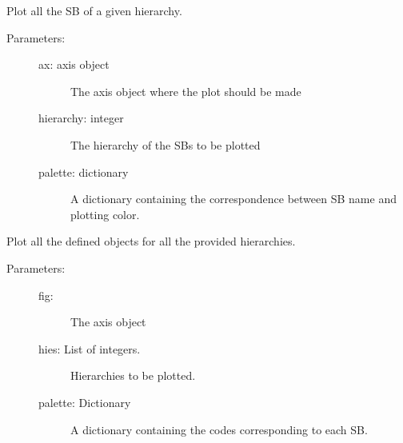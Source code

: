 \documentclass[letterpaper,10pt,english]{sphinxmanual}
\begin{document}
\begin{fulllineitems}
\label{\detokenize{hiegeo:hiegeo.plot_sb_by_hie_ax}}
Plot all the SB of a given hierarchy.
\begin{description}
\item[{Parameters:}] \leavevmode\begin{description}
\item[{ax: axis object}] \leavevmode
The axis object where the plot should be made

\item[{hierarchy: integer}] \leavevmode
The hierarchy of the SBs to be plotted

\item[{palette: dictionary}] \leavevmode
A dictionary containing the correspondence between
SB name and plotting color.

\end{description}

\end{description}

\end{fulllineitems}


\begin{fulllineitems}
\label{\detokenize{hiegeo:hiegeo.plot_sb_fig}}
Plot all the defined objects for all the provided hierarchies.
\begin{description}
\item[{Parameters:}] \leavevmode\begin{description}
\item[{fig:}] \leavevmode
The axis object

\item[{hies: List of integers.}] \leavevmode
Hierarchies to be plotted.

\item[{palette: Dictionary}] \leavevmode
A dictionary containing the codes corresponding to each SB.

\end{description}

\end{description}

\end{fulllineitems}
\end{document}
